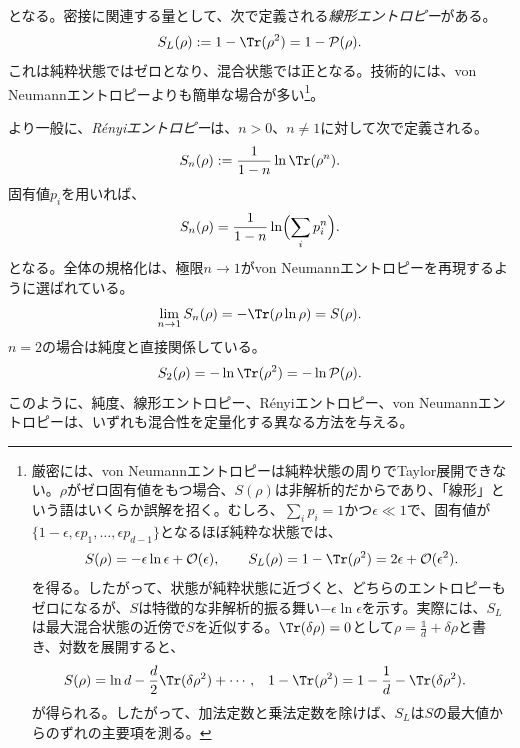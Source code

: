\documentclass[a4paper,11pt,oneside]{article}
\theoremstyle{definition}
\numberwithin{equation}{section}
\begin{document}
となる。密接に関連する量として、次で定義される\textit{線形エントロピー}がある。
\begin{equation}
S_L(\rho) := 1-\Tr(\rho^2) = 1-\mathcal P(\rho) .
\end{equation}
これは純粋状態ではゼロとなり、混合状態では正となる。技術的には、von Neumannエントロピーよりも簡単な場合が多い\footnote{厳密には、von Neumannエントロピーは純粋状態の周りでTaylor展開できない。$\rho$がゼロ固有値をもつ場合、$S(\rho)$は非解析的だからであり、「線形」という語はいくらか誤解を招く。むしろ、$\sum_i p_i=1$かつ$\epsilon\ll1$で、固有値が$\{1-\epsilon,\epsilon p_1,\ldots,\epsilon p_{d-1}\}$となるほぼ純粋な状態では、
\[
S(\rho)=-\epsilon\ln\epsilon+\mathcal{O}(\epsilon),\qquad
S_L(\rho)=1-\Tr(\rho^2)=2\epsilon+\mathcal{O}(\epsilon^2).
\]
を得る。したがって、状態が純粋状態に近づくと、どちらのエントロピーもゼロになるが、$  S $は特徴的な非解析的振る舞い$-\epsilon\ln\epsilon$を示す。実際には、$  S_{L} $は最大混合状態の近傍で$  S $を近似する。$ \Tr(\delta\rho)=0   $として$ \rho = \frac{\mathds{1} }{d}+\delta\rho  $と書き、対数を展開すると、
\begin{align}
S(\rho)&=\ln d - \frac{d}{2}\Tr(\delta\rho^2)+\cdots , & 1-\Tr(\rho^2)&=1-\frac{1}{d}-\Tr(\delta\rho^2) .
\end{align}
が得られる。したがって、加法定数と乗法定数を除けば、$  S_{L} $は$  S $の最大値からのずれの主要項を測る。}。












より一般に、\textit{R\'enyiエントロピー}は、$n>0$、$n\neq 1$に対して次で定義される。
\begin{equation}
S_n(\rho)
:=
\frac{1}{1-n}\ln \Tr(\rho^n) .
\end{equation}
固有値$p_i$を用いれば、
\begin{equation}
S_n(\rho)
=
\frac{1}{1-n}\ln\Bigl(\sum_i p_i^n\Bigr) .
\end{equation}
となる。全体の規格化は、極限$n\to 1$がvon Neumannエントロピーを再現するように選ばれている。
\begin{equation}
\lim_{n\to 1} S_n(\rho)= -\Tr(\rho\ln\rho)=S(\rho) .
\end{equation}
$n=2$の場合は純度と直接関係している。
\begin{equation}
S_2(\rho) = -\ln \Tr(\rho^2) = -\ln \mathcal P(\rho) .
\end{equation}
このように、純度、線形エントロピー、R\'enyiエントロピー、von Neumannエントロピーは、いずれも混合性を定量化する異なる方法を与える。
\end{document}
